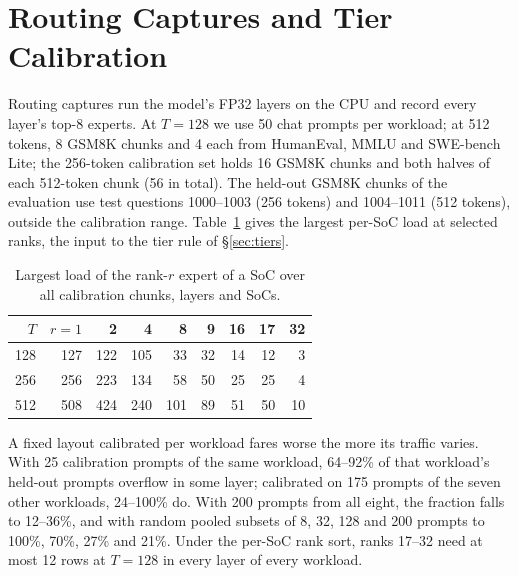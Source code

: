 \section{Routing Captures and Tier Calibration}
\label{app:calib}

Routing captures run the model's FP32 layers on the CPU and record every layer's top-8 experts. At $T=128$ we use 50
chat prompts per workload; at 512 tokens, 8 GSM8K chunks and 4 each from HumanEval, MMLU and SWE-bench Lite; the 256-token
calibration set holds 16 GSM8K chunks and both halves of each 512-token chunk (56 in total). The held-out GSM8K chunks of
the evaluation use test questions 1000--1003 (256 tokens) and 1004--1011 (512 tokens), outside the calibration range.
Table~\ref{tab:ranks} gives the largest per-SoC load at selected ranks, the input to the tier rule of \S\ref{sec:tiers}.

\begin{table}[H]
\caption{Largest load of the rank-$r$ expert of a SoC over all calibration chunks, layers and SoCs.}
\label{tab:ranks}
\vskip 0.1in
\begin{center}
\begin{small}
\setlength{\tabcolsep}{3.5pt}
\begin{tabular}{@{}rrrrrrrrr@{}}
\toprule
$T$ & $r=1$ & 2 & 4 & 8 & 9 & 16 & 17 & 32 \\
\midrule
128 & 127 & 122 & 105 & 33 & 32 & 14 & 12 & 3 \\
256 & 256 & 223 & 134 & 58 & 50 & 25 & 25 & 4 \\
512 & 508 & 424 & 240 & 101 & 89 & 51 & 50 & 10 \\
\bottomrule
\end{tabular}
\end{small}
\end{center}
\end{table}

A fixed layout calibrated per workload fares worse the more its traffic varies. With 25 calibration prompts of the same
workload, 64--92\% of that workload's held-out prompts overflow in some layer; calibrated on 175 prompts of the seven
other workloads, 24--100\% do. With 200 prompts from all eight, the fraction falls to 12--36\%, and with random pooled
subsets of 8, 32, 128 and 200 prompts to 100\%, 70\%, 27\% and 21\%. Under the per-SoC rank sort, ranks 17--32 need at
most 12 rows at $T=128$ in every layer of every workload.
